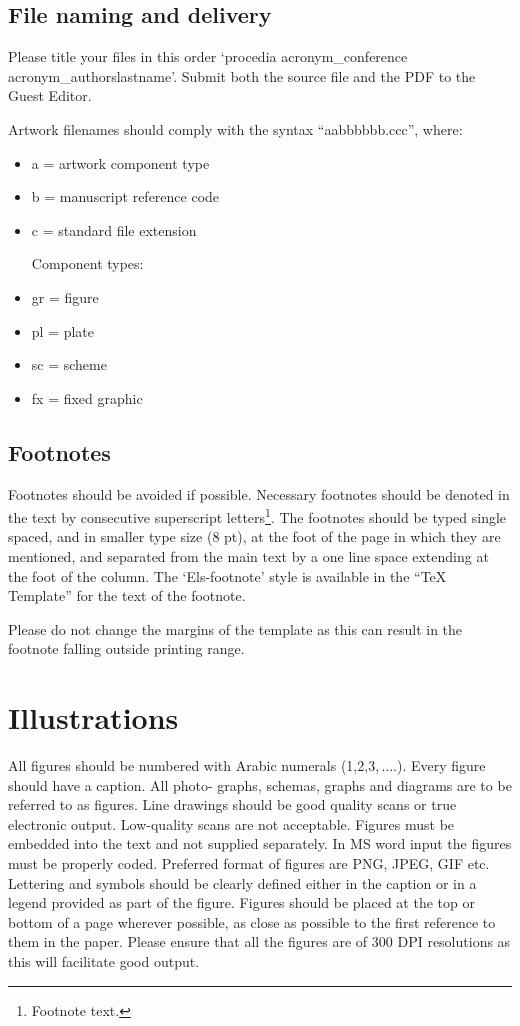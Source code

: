 \documentclass[3p,times,procedia,twocolumn,twoside]{elsarticle}
\begin{document}
\subsection{File naming and delivery}
Please title your files in this order `procedia acronym\_conference
acronym\_authorslastname'. Submit both the source file and the PDF to
the Guest Editor.

Artwork filenames should comply with the syntax ``aabbbbbb.ccc'', where:
\begin{itemize}
\item a = artwork component type
\item b = manuscript reference code
\item c = standard file extension

Component types:
\item gr = figure
\item pl = plate
\item sc = scheme
\item fx = fixed graphic
\end{itemize}


\subsection{Footnotes}
Footnotes should be avoided if possible. Necessary footnotes should be
denoted in the text by consecutive superscript
letters\footnote{Footnote text.}. The footnotes should be typed single
spaced, and in smaller type size (8 pt), at the foot of the page in
which they are mentioned, and separated from the main text by a one
line space extending at the foot of the column. The `Els-footnote'
style is available in the ``TeX Template'' for the text of the
footnote.

Please do not change the margins of the template as this can result in
the footnote falling outside printing range.



\section{Illustrations}
All figures should be numbered with Arabic numerals
(1,2,3,\,$\ldots.$). Every figure should have a caption. All photo-
graphs, schemas, graphs and diagrams are to be referred to as
figures. Line drawings should be good quality scans or true electronic
output. Low-quality scans are not acceptable.  Figures must be
embedded into the text and not supplied separately. In MS word input
the figures must be properly coded. Preferred format of figures are
PNG, JPEG, GIF etc. Lettering and symbols should be clearly defined
either in the caption or in a legend provided as part of the
figure. Figures should be placed at the top or bottom of a page
wherever possible, as close as possible to the first reference to them
in the paper. Please ensure that all the figures are of 300 DPI
resolutions as this will facilitate good output.
\end{document}
